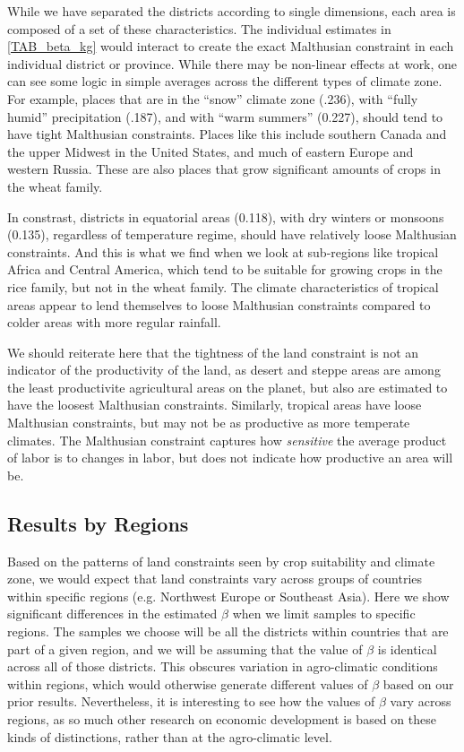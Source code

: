 \documentclass[11pt]{article}
\begin{document}
While we have separated the districts according to single dimensions, each area is composed of a set of these characteristics. The individual estimates in \ref{TAB_beta_kg} would interact to create the exact Malthusian constraint in each individual district or province. While there may be non-linear effects at work, one can see some logic in simple averages across the different types of climate zone. For example, places that are in the ``snow'' climate zone (.236), with ``fully humid'' precipitation (.187), and with ``warm summers'' (0.227), should tend to have tight Malthusian constraints. Places like this include southern Canada and the upper Midwest in the United States, and much of eastern Europe and western Russia. These are also places that grow significant amounts of crops in the wheat family. 

In constrast, districts in equatorial areas (0.118), with dry winters or monsoons (0.135), regardless of temperature regime, should have relatively loose Malthusian constraints. And this is what we find when we look at sub-regions like tropical Africa and Central America, which tend to be suitable for growing crops in the rice family, but not in the wheat family. The climate characteristics of tropical areas appear to lend themselves to loose Malthusian constraints compared to colder areas with more regular rainfall. 

We should reiterate here that the tightness of the land constraint is not an indicator of the productivity of the land, as desert and steppe areas are among the least productivite agricultural areas on the planet, but also are estimated to have the loosest Malthusian constraints. Similarly, tropical areas have loose Malthusian constraints, but may not be as productive as more temperate climates. The Malthusian constraint captures how \textit{sensitive} the average product of labor is to changes in labor, but does not indicate how productive an area will be.

\subsection{Results by Regions}
Based on the patterns of land constraints seen by crop suitability and climate zone, we would expect that land constraints vary across groups of countries within specific regions (e.g. Northwest Europe or Southeast Asia). Here we show significant differences in the estimated $\beta$ when we limit samples to specific regions. The samples we choose will be all the districts within countries that are part of a given region, and we will be assuming that the value of $\beta$ is identical across all of those districts. This obscures variation in agro-climatic conditions within regions, which would otherwise generate different values of $\beta$ based on our prior results. Nevertheless, it is interesting to see how the values of $\beta$ vary across regions, as so much other research on economic development is based on these kinds of distinctions, rather than at the agro-climatic level.
\end{document}
